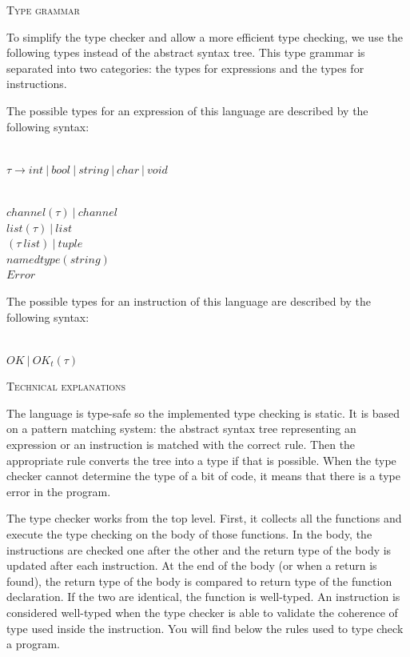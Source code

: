 \documentclass[11pt]{report}
\begin{document}
\newpage

{}

\vspace*{10pt}
\vspace*{3pt}
{}
\tabto{1cm} {\Large \textsc{Type grammar}}

\tabto{0cm}To simplify the type checker and allow a more efficient type checking, we use the following types instead of the abstract syntax tree. This type grammar is separated into two categories: the types for expressions and the types for instructions.

\tabto{0cm}The possible types for an expression of this language are described by the following syntax:
\\ \\
\centerline{$\tau \rightarrow int \ | \ bool \ | \ string \ | \ char \ | \ void$} \\
$ channel( \tau) \ | \ channel $ \\
$ list(\tau) \ | \ list $ \\
$ ( \tau \ list) \ | \ tuple $ \\
$ namedtype(string)$ \\
$ Error $

\tabto{0cm}The possible types for an instruction of this language are described by the following syntax:
\\ \\
\centerline{$OK \ | \ OK_t(\tau)$}

\vspace*{10pt}
\vspace*{3pt}
{}
\tabto{1cm} {\Large \textsc{Technical explanations}}

\tabto{0cm}The language is type-safe so the implemented type checking is static. It is based on a pattern matching system: the abstract syntax tree representing an expression or an instruction is matched with the correct rule. Then the appropriate rule converts the tree into a type if that is possible. When the type checker cannot determine the type of a bit of code, it means that there is a type error in the program.

\tabto{0cm}The type checker works from the top level. First, it collects all the functions and execute the type checking on the body of those functions. In the body, the instructions are checked one after the other and the return type of the body is updated after each instruction. At the end of the body (or when a return is found), the return type of the body is compared to return type of the function declaration. If the two are identical, the function is well-typed. An instruction is considered well-typed when the type checker is able to validate the coherence of type used inside the instruction. You will find below the rules used to type check a program. 
\end{document}
